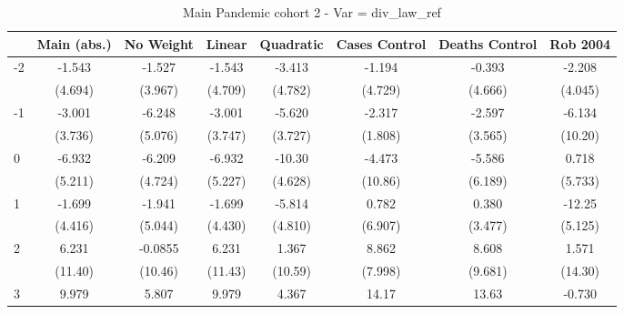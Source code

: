 \documentclass{article}
\begin{document}
{
\def\sym#1{\ifmmode^{#1}\else\(^{#1}\)\fi}
\begin{longtable}{l*{7}{c}}
\caption{Main Pandemic cohort 2 - Var = div\_law\_ref}\\
\hline\hline\endfirsthead\hline\endhead\hline\endfoot\endlastfoot
                &\multicolumn{1}{c}{Main (abs.)}&\multicolumn{1}{c}{No Weight}&\multicolumn{1}{c}{Linear}&\multicolumn{1}{c}{Quadratic}&\multicolumn{1}{c}{Cases Control}&\multicolumn{1}{c}{Deaths Control}&\multicolumn{1}{c}{Rob 2004}\\
\hline
-2              &   -1.543         &   -1.527         &   -1.543         &   -3.413         &   -1.194         &   -0.393         &   -2.208         \\
                &  (4.694)         &  (3.967)         &  (4.709)         &  (4.782)         &  (4.729)         &  (4.666)         &  (4.045)         \\
-1              &   -3.001         &   -6.248         &   -3.001         &   -5.620         &   -2.317         &   -2.597         &   -6.134         \\
                &  (3.736)         &  (5.076)         &  (3.747)         &  (3.727)         &  (1.808)         &  (3.565)         &  (10.20)         \\
0               &   -6.932         &   -6.209         &   -6.932         &   -10.30         &   -4.473         &   -5.586         &    0.718         \\
                &  (5.211)         &  (4.724)         &  (5.227)         &  (4.628)         &  (10.86)         &  (6.189)         &  (5.733)         \\
1               &   -1.699         &   -1.941         &   -1.699         &   -5.814         &    0.782         &    0.380         &   -12.25         \\
                &  (4.416)         &  (5.044)         &  (4.430)         &  (4.810)         &  (6.907)         &  (3.477)         &  (5.125)         \\
2               &    6.231         &  -0.0855         &    6.231         &    1.367         &    8.862         &    8.608         &    1.571         \\
                &  (11.40)         &  (10.46)         &  (11.43)         &  (10.59)         &  (7.998)         &  (9.681)         &  (14.30)         \\
3               &    9.979         &    5.807         &    9.979         &    4.367         &    14.17         &    13.63         &   -0.730         \\

\end{longtable}}
\end{document}
